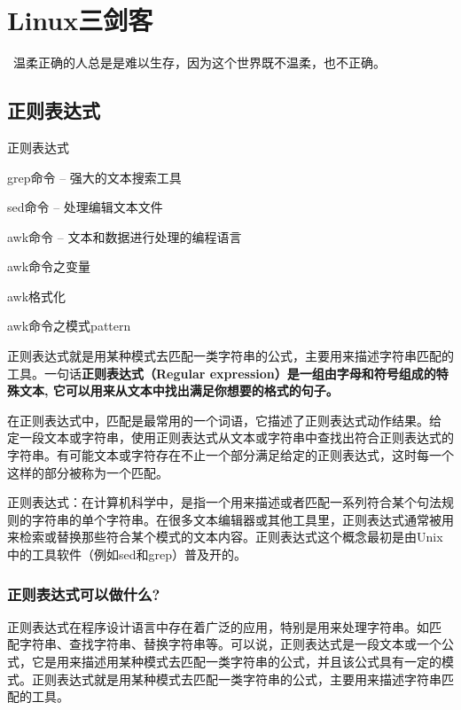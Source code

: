 \chapter{Linux三剑客}
\begin{center}{\textcolor[RGB]{255, 0, 0}{\faHeart}~温柔正确的人总是是难以生存，因为这个世界既不温柔，也不正确。~\textcolor[RGB]{255, 0, 0}{\faHeart}}
\end{center}
\begin{center}
\end{center}
\section{正则表达式}
\begin{introduction}
	\item 正则表达式
	\item grep命令 – 强大的文本搜索工具
	\item sed命令 – 处理编辑文本文件
	\item awk命令 – 文本和数据进行处理的编程语言
	\item awk命令之变量
	\item awk格式化
	\item awk命令之模式pattern
\end{introduction}
正则表达式就是用某种模式去匹配一类字符串的公式，主要用来描述字符串匹配的工具。一句话\textbf{正则表达式（Regular expression）是一组由字母和符号组成的特殊文本, 它可以用来从文本中找出满足你想要的格式的句子。}

在正则表达式中，匹配是最常用的一个词语，它描述了正则表达式动作结果。给 定一段文本或字符串，使用正则表达式从文本或字符串中查找出符合正则表达式的字符串。有可能文本或字符存在不止一个部分满足给定的正则表达式，这时每一个这样的部分被称为一个匹配。

正则表达式：在计算机科学中，是指一个用来描述或者匹配一系列符合某个句法规则的字符串的单个字符串。在很多文本编辑器或其他工具里，正则表达式通常被用来检索或替换那些符合某个模式的文本内容。正则表达式这个概念最初是由Unix中的工具软件（例如sed和grep）普及开的。

\subsection{正则表达式可以做什么?}
正则表达式在程序设计语言中存在着广泛的应用，特别是用来处理字符串。如匹  配字符串、查找字符串、替换字符串等。可以说，正则表达式是一段文本或一个公式，它是用来描述用某种模式去匹配一类字符串的公式，并且该公式具有一定的模  式。正则表达式就是用某种模式去匹配一类字符串的公式，主要用来描述字符串匹配的工具。

